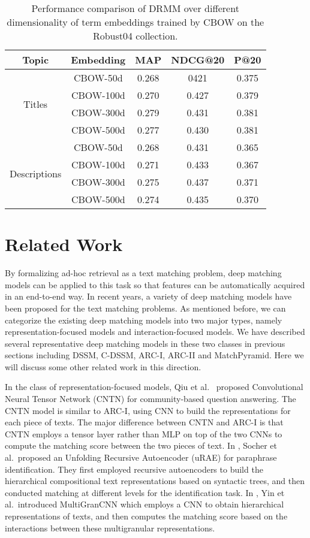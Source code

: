 \documentclass{sig-alternate-05-2015}
\begin{document}
\begin{table}
  \centering\small
  \caption{Performance comparison of DRMM over \mbox{different} dimensionality of term embeddings trained by CBOW on the Robust04 collection.}
  \begin{tabular}{c c c c c }
 \hline
    Topic & Embedding & MAP & NDCG@20 & P@20 \\\hline
    \multirow{4}{*}{Titles} & CBOW-50d & 0.268 & 0421 & 0.375  \\
    &CBOW-100d & 0.270 & 0.427 & 0.379 \\
    &CBOW-300d & 0.279 & 0.431 & 0.381 \\
    &CBOW-500d & 0.277 & 0.430 & 0.381 \\\hline
    \multirow{4}{*}{Descriptions} & CBOW-50d &  0.268 & 0.431 & 0.365  \\
    &CBOW-100d & 0.271 & 0.433 & 0.367  \\
    &CBOW-300d & 0.275 & 0.437 & 0.371 \\
    &CBOW-500d & 0.274 & 0.435 & 0.370 \\\hline
  \end{tabular}
  \label{tab:dimension}
\end{table}


\section{Related Work}
By formalizing ad-hoc retrieval as a text matching problem, deep matching models can be applied to this task so that features can be automatically acquired in an end-to-end way. In recent years, a variety of deep matching models have been proposed for the text matching problems. As mentioned before, we can categorize the existing deep matching models into two major types, namely representation-focused models and interaction-focused models. We have described several representative deep matching models in these two classes in previous sections including DSSM, C-DSSM, ARC-I, ARC-II and MatchPyramid. Here we will discuss some other related work in this direction.

In the class of representation-focused models, Qiu et al.~\cite{qiu2015convolutional} proposed Convolutional Neural Tensor Network (CNTN) for community-based question answering. The CNTN model is similar to ARC-I, using CNN to build the representations for each piece of texts. The major difference between CNTN and ARC-I is that CNTN employs a tensor layer rather than MLP on top of the two CNNs to compute the matching score between the two pieces of text. In \cite{socher2011dynamic}, Socher et al.~proposed an Unfolding Recursive Autoencoder (uRAE) for paraphrase identification. They first employed recursive autoencoders to build the hierarchical compositional text representations based on syntactic trees, and then conducted matching at different levels for the identification task. In \cite{yin2015multigrancnn}, Yin et al.~introduced MultiGranCNN which employs a CNN to obtain hierarchical representations of texts, and then computes the matching score based on the interactions between these multigranular representations.
\end{document}
